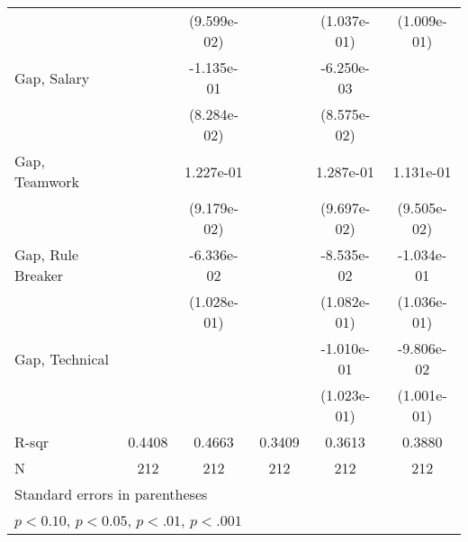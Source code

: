 {\begin{tabular}{l*{5}{c}}
                              &                       & (9.599e-02)           &                       & (1.037e-01)           & (1.009e-01)                 \\
    \addlinespace
    Gap, Salary               &                       & -1.135e-01            &                       & -6.250e-03            &                             \\
                              &                       & (8.284e-02)           &                       & (8.575e-02)           &                             \\
    \addlinespace
    Gap, Teamwork             &                       & 1.227e-01             &                       & 1.287e-01             & 1.131e-01                   \\
                              &                       & (9.179e-02)           &                       & (9.697e-02)           & (9.505e-02)                 \\
    \addlinespace
    Gap, Rule Breaker         &                       & -6.336e-02            &                       & -8.535e-02            & -1.034e-01                  \\
                              &                       & (1.028e-01)           &                       & (1.082e-01)           & (1.036e-01)                 \\
    \addlinespace
    Gap, Technical            &                       &                       &                       & -1.010e-01            & -9.806e-02                  \\
                              &                       &                       &                       & (1.023e-01)           & (1.001e-01)                 \\
    \midrule
    R-sqr                     & 0.4408                & 0.4663                & 0.3409                & 0.3613                & 0.3880                      \\
    N                         & 212                   & 212                   & 212                   & 212                   & 212                         \\
    \bottomrule
    \multicolumn{6}{l}{\footnotesize Standard errors in parentheses}                                                                                        \\
    \multicolumn{6}{l}{\footnotesize \sym{+} \(p<0.10\), \sym{++} \(p<0.05\), \sym{*} \(p<.01\), \sym{**} \(p<.001\)}                                       \\
\end{tabular}
}
